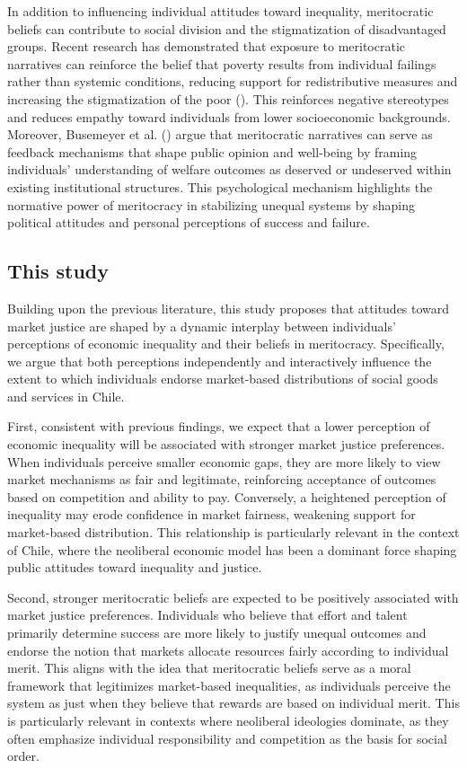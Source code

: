\documentclass[
  12pt,
]{article}
\begin{document}
In addition to influencing individual attitudes toward inequality,
meritocratic beliefs can contribute to social division and the
stigmatization of disadvantaged groups. Recent research has demonstrated
that exposure to meritocratic narratives can reinforce the belief that
poverty results from individual failings rather than systemic
conditions, reducing support for redistributive measures and increasing
the stigmatization of the poor (). This reinforces negative stereotypes and reduces empathy
toward individuals from lower socioeconomic backgrounds. Moreover,
Busemeyer et al. () argue
that meritocratic narratives can serve as feedback mechanisms that shape
public opinion and well-being by framing individuals' understanding of
welfare outcomes as deserved or undeserved within existing institutional
structures. This psychological mechanism highlights the normative power
of meritocracy in stabilizing unequal systems by shaping political
attitudes and personal perceptions of success and failure.

\subsection{This study}\label{this-study}

Building upon the previous literature, this study proposes that
attitudes toward market justice are shaped by a dynamic interplay
between individuals' perceptions of economic inequality and their
beliefs in meritocracy. Specifically, we argue that both perceptions
independently and interactively influence the extent to which
individuals endorse market-based distributions of social goods and
services in Chile.

First, consistent with previous findings, we expect that a lower
perception of economic inequality will be associated with stronger
market justice preferences. When individuals perceive smaller economic
gaps, they are more likely to view market mechanisms as fair and
legitimate, reinforcing acceptance of outcomes based on competition and
ability to pay. Conversely, a heightened perception of inequality may
erode confidence in market fairness, weakening support for market-based
distribution. This relationship is particularly relevant in the context
of Chile, where the neoliberal economic model has been a dominant force
shaping public attitudes toward inequality and justice.

Second, stronger meritocratic beliefs are expected to be positively
associated with market justice preferences. Individuals who believe that
effort and talent primarily determine success are more likely to justify
unequal outcomes and endorse the notion that markets allocate resources
fairly according to individual merit. This aligns with the idea that
meritocratic beliefs serve as a moral framework that legitimizes
market-based inequalities, as individuals perceive the system as just
when they believe that rewards are based on individual merit. This is
particularly relevant in contexts where neoliberal ideologies dominate,
as they often emphasize individual responsibility and competition as the
basis for social order.
\end{document}
